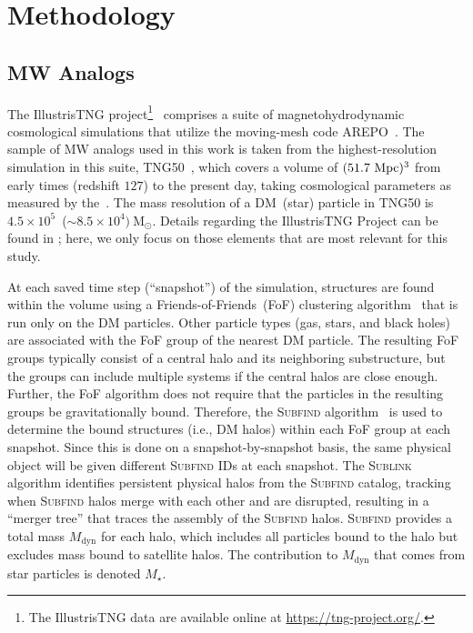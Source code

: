 \documentclass[twocolumn,tighten,twocolappendix]{aastex701}
\newcommand{\subfind}{\textsc{Subfind}}
\newcommand{\sublink}{\textsc{Sublink}}
\newcommand{\Msun}{\ensuremath{\mathrm{M}_\odot}}
\newcommand{\Mdyn}{\ensuremath{M_\mathrm{dyn}}}
\newcommand{\osim}{\mathord{\sim}}
\begin{document}
\section{Methodology}\label{sec:methods}
\subsection{MW Analogs}

The IllustrisTNG project\footnote{The IllustrisTNG data are available online at \url{https://tng-project.org/}.}~\citep{2019ComAC...6....2N} comprises a suite of magnetohydrodynamic cosmological simulations that utilize the moving-mesh code AREPO~\citep{2010ARA&A..48..391S}. The sample of MW analogs used in this work is taken from the highest-resolution simulation in this suite, TNG50~\citep{2019MNRAS.490.3234N, 2019MNRAS.490.3196P}, which covers a volume of $(51.7~\rm{Mpc})^3$ from early times (redshift $127$) to the present day, taking cosmological parameters as measured by the~\citet{2016A&A...594A..13P}. The mass resolution of a DM~(star) particle in TNG50 is $4.5\times10^5$~($\osim8.5\times10^4)~\Msun$.  Details regarding the IllustrisTNG Project can be found in \citet{2019ComAC...6....2N}; here, we only focus on those elements that are most relevant for this study.

At each saved time step (``snapshot'') of the simulation, structures are found within the volume using a Friends-of-Friends~(FoF) clustering algorithm~\citep{1985ApJ...292..371D} that is run only on the DM particles. Other particle types (gas, stars, and black holes) are associated with the FoF group of the nearest DM particle. The resulting FoF groups typically consist of a central halo and its neighboring substructure, but the groups can include multiple systems if the central halos are close enough. Further, the FoF algorithm does not require that the particles in the resulting groups be gravitationally bound. Therefore, the \subfind{} algorithm~\citep{2001MNRAS.328..726S, 2009MNRAS.399..497D} is used to determine the bound structures (i.e., DM halos) within each FoF group at each snapshot. Since this is done on a snapshot-by-snapshot basis, the same physical object will be given different \subfind{} IDs at each snapshot. The \sublink{} algorithm identifies persistent physical halos from the \subfind{} catalog, tracking when \subfind{} halos merge with each other and are disrupted, resulting in a ``merger tree'' that traces the assembly of the \subfind{} halos. \subfind{} provides a total mass \Mdyn{} for each halo, which includes all particles bound to the halo but excludes mass bound to satellite halos. The contribution to \Mdyn{} that comes from star particles is denoted $M_\star$.
\end{document}
